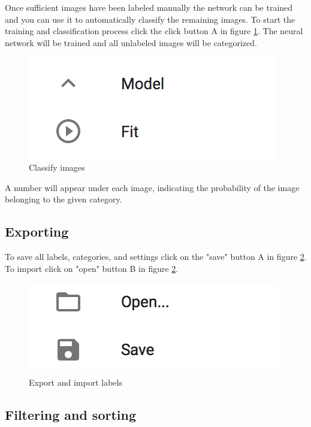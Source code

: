 Once sufficient images have been labeled manually the network can be trained and you can use it 
to automatically classify the remaining images.
To start the training and classification process click the click button A in figure \ref{fig:Classify}.
The neural network will be trained and all unlabeled
images will be categorized.

\begin{figure}[H]
	\centering
	\includegraphics[scale=0.8]{bilder/cyto/Fit.png}
	\caption{Classify images}
	\label{fig:Classify}
\end{figure}

A number will appear under each image, indicating the
probability of the image belonging to the given category.

\subsection{Exporting}

To save all labels, categories, and settings click on the "save" button A in figure \ref{fig:ExportImport}.
To import click on "open" button B in figure \ref{fig:ExportImport}.

\begin{figure}[H]
	\centering
	\includegraphics[scale=0.8]{bilder/cyto/OpenSave.png}
	\caption{Export and import labels}
	\label{fig:ExportImport}
\end{figure}

\subsection{Filtering and sorting}
 
